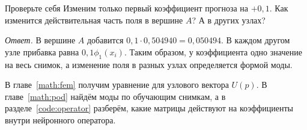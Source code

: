 \begin{worked}{Проверьте себя}
Изменим только первый коэффициент прогноза на $+0{,}1$. Как изменится
действительная часть поля в вершине $A$? А в других узлах?

\textit{Ответ.} В вершине $A$ добавится $0{,}1\cdot0{,}504940=0{,}050494$.
В каждом другом узле прибавка равна $0{,}1\phi_1(x_i)$. Таким образом,
у коэффициента одно значение на весь снимок, а изменение поля в разных
узлах определяется формой моды.
\end{worked}

В главе~\ref{math:fem} получим уравнение для узлового вектора $U(p)$.
В главе~\ref{math:pod} найдём моды по обучающим снимкам, а в
разделе~\ref{code:operator} разберём, какие матрицы действуют на
коэффициенты внутри нейронного оператора.
